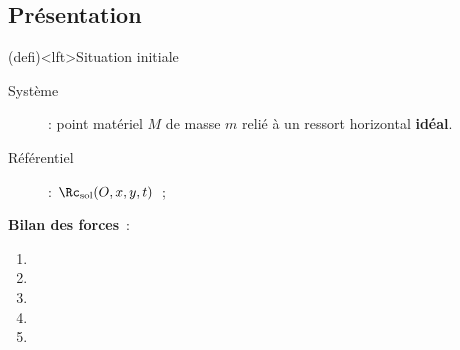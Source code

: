 \documentclass[../../main/main.tex]{subfiles}
\begin{document}
\subsection{Présentation}
\begin{tcb}(defi)<lft>{Situation initiale}
	\begin{description}
		\item[Système] : point matériel $M$ de masse $m$ relié à un ressort
			horizontal \textbf{idéal}.
		\item[Référentiel] : $\Rc_{\rm sol} (O,x,y,t)$~;
	\end{description}
	\bigbreak
	\begin{minipage}{0.55\linewidth}
		\textbf{Bilan des forces}~:
		\begin{enumerate}
			\item
			\item
			\item
			\item
			\item
		\end{enumerate}
	\end{minipage}
	\begin{minipage}{0.45\linewidth}
		\begin{center}
			\vspace{-15pt}
		\end{center}
	\end{minipage}

\end{tcb}
\end{document}
